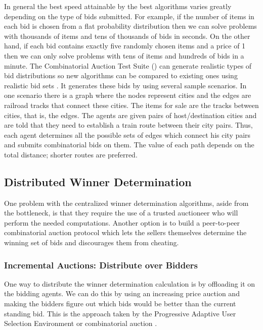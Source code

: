 In general the best speed attainable by the best algorithms varies
greatly depending on the type of bids submitted. For example, if the
number of items in each bid is chosen from a flat probability
distribution then we can solve problems with thousands of items and
tens of thousands of bids in seconds. On the other hand, if each bid
contains exactly five randomly chosen items and a price of 1 then we
can only solve problems with tens of items and hundreds of bids in a
minute. The Combinatorial Auction Test Suite () can generate
realistic types of bid distributions so new algorithms can be compared
to existing ones using realistic bid sets \cite{leyton-brown00a}. It
generates these bids by using several sample scenarios. In one
scenario there is a graph where the nodes represent cities and the
edges are railroad tracks that connect these cities. The items for
sale are the tracks between cities, that is, the edges. The agents are
given pairs of host/destination cities and are told that they need to
establish a train route between their city pairs. Thus, each agent
determines all the possible sets of edges which connect his city pairs
and submits  combinatorial bids on them. The value of each
path depends on the total distance; shorter routes are preferred.


\subsection{Distributed Winner Determination}

One problem with the centralized winner determination algorithms,
aside from the bottleneck, is that they require the use of a trusted
auctioneer who will perform the needed computations. Another option is
to build a peer-to-peer combinatorial auction protocol which lets the
sellers themselves determine the winning set of bids and discourages
them from cheating.

\subsubsection{Incremental Auctions: Distribute over Bidders}
\label{sec:incremental-auctions}

One way to distribute the winner determination calculation is by
offloading it on the bidding agents. We can do this by using an
increasing price auction and making the bidders figure out which bids
would be better than the current standing bid. This is the approach
taken by the Progressive Adaptive User Selection Environment or
 combinatorial auction \cite{kelly00a} \cite[Chapter
6]{cramton06a}.

